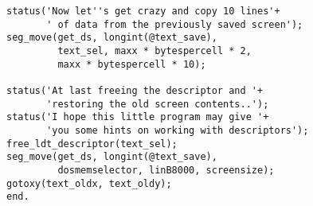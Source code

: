 \begin{FPCList}
\begin{verbatim}
status('Now let''s get crazy and copy 10 lines'+
       ' of data from the previously saved screen');
seg_move(get_ds, longint(@text_save), 
         text_sel, maxx * bytespercell * 2, 
         maxx * bytespercell * 10);

status('At last freeing the descriptor and '+
       'restoring the old screen contents..');
status('I hope this little program may give '+
       'you some hints on working with descriptors');
free_ldt_descriptor(text_sel);
seg_move(get_ds, longint(@text_save), 
         dosmemselector, linB8000, screensize);
gotoxy(text_oldx, text_oldy);
end.\end{verbatim}
\end{FPCList}